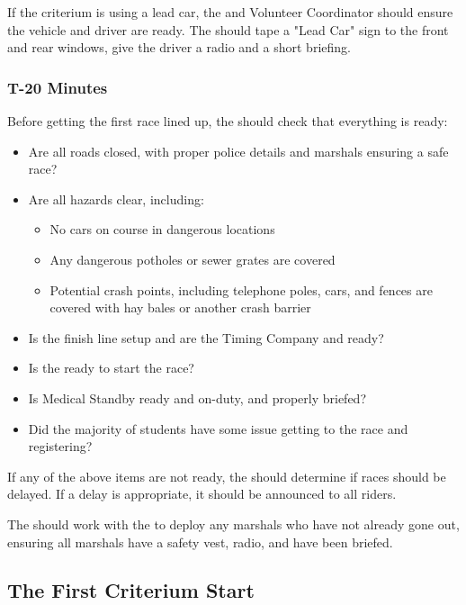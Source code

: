 If the criterium is using a lead car, the  and Volunteer Coordinator should ensure the vehicle and driver are ready.
The  should tape a "Lead Car" sign to the front and rear windows,
give the driver a radio and a short briefing.

\subsubsection{T-20 Minutes}

Before getting the first race lined up, the  should check that everything is ready:

\begin{itemize}
  \item Are all roads closed, with proper police details and marshals ensuring a safe race?
  \item Are all hazards clear, including:
  \begin{itemize}
    \item No cars on course in dangerous locations
    \item Any dangerous potholes or sewer grates are covered
    \item Potential crash points, including telephone poles, cars, and fences are covered with hay bales or another crash barrier
  \end{itemize}
  \item Is the finish line setup and are the Timing Company and  ready?
  \item Is the  ready to start the race?
  \item Is Medical Standby ready and on-duty, and properly briefed?
  \item Did the majority of students have some issue getting to the race and registering?
\end{itemize}

If any of the above items are not ready, the  should determine if races should be delayed.
If a delay is appropriate, it should be announced to all riders.

The  should work with the  to deploy any marshals who have not already gone out,
ensuring all marshals have a safety vest, radio, and have been briefed.

\subsection[First Criterium Start]{The First Criterium Start}

